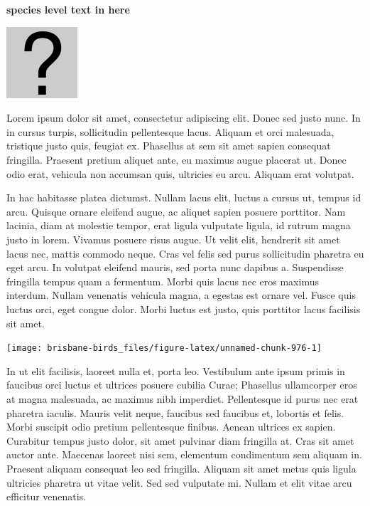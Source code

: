 \documentclass[]{book}
\let\origfigure\figure
\let\endorigfigure\endfigure
\renewenvironment{figure}[1][2] {
  \expandafter\origfigure\expandafter[H]
} {
  \endorigfigure
}
\begin{document}
\textbf{species level text in here}

\begin{figure}
\centering
\includegraphics{assets/missing.png}
\caption{No image for species}
\end{figure}

Lorem ipsum dolor sit amet, consectetur adipiscing elit. Donec sed justo
nunc. In in cursus turpis, sollicitudin pellentesque lacus. Aliquam et
orci malesuada, tristique justo quis, feugiat ex. Phasellus at sem sit
amet sapien consequat fringilla. Praesent pretium aliquet ante, eu
maximus augue placerat ut. Donec odio erat, vehicula non accumsan quis,
ultricies eu arcu. Aliquam erat volutpat.

In hac habitasse platea dictumst. Nullam lacus elit, luctus a cursus ut,
tempus id arcu. Quisque ornare eleifend augue, ac aliquet sapien posuere
porttitor. Nam lacinia, diam at molestie tempor, erat ligula vulputate
ligula, id rutrum magna justo in lorem. Vivamus posuere risus augue. Ut
velit elit, hendrerit sit amet lacus nec, mattis commodo neque. Cras vel
felis sed purus sollicitudin pharetra eu eget arcu. In volutpat eleifend
mauris, sed porta nunc dapibus a. Suspendisse fringilla tempus quam a
fermentum. Morbi quis lacus nec eros maximus interdum. Nullam venenatis
vehicula magna, a egestas est ornare vel. Fusce quis luctus orci, eget
congue dolor. Morbi luctus est justo, quis porttitor lacus facilisis sit
amet.

\begin{figure}
\texttt{[image: brisbane-birds\_files/figure-latex/unnamed-chunk-976-1]} \caption{insert figure caption}\label{fig:unnamed-chunk-976}
\end{figure}

In ut elit facilisis, laoreet nulla et, porta leo. Vestibulum ante ipsum
primis in faucibus orci luctus et ultrices posuere cubilia Curae;
Phasellus ullamcorper eros at magna malesuada, ac maximus nibh
imperdiet. Pellentesque id purus nec erat pharetra iaculis. Mauris velit
neque, faucibus sed faucibus et, lobortis et felis. Morbi suscipit odio
pretium pellentesque finibus. Aenean ultrices ex sapien. Curabitur
tempus justo dolor, sit amet pulvinar diam fringilla at. Cras sit amet
auctor ante. Maecenas laoreet nisi sem, elementum condimentum sem
aliquam in. Praesent aliquam consequat leo sed fringilla. Aliquam sit
amet metus quis ligula ultricies pharetra ut vitae velit. Sed sed
vulputate mi. Nullam et elit vitae arcu efficitur venenatis.
\end{document}
